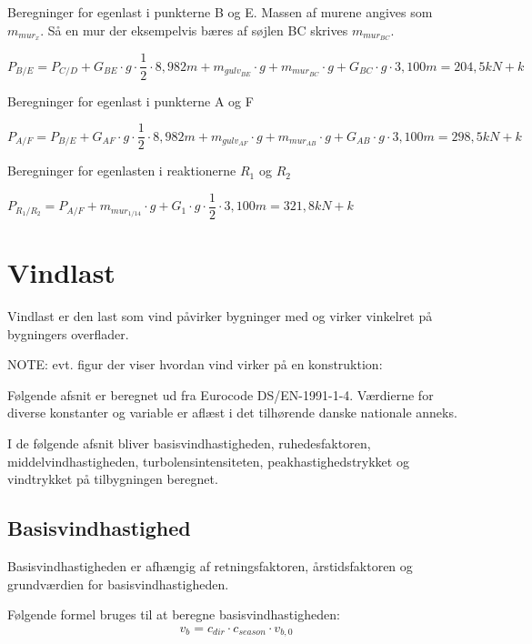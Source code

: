 Beregninger for egenlast i punkterne B og E. 
\newline
Massen af murene angives som $ m_{mur_{x}} $. Så en mur der eksempelvis bæres af søjlen BC skrives $ m_{mur_{BC}} $.
\begin{center}
	$ P_{B/E}=P_{C/D}+G_{BE}\cdot g\cdot \dfrac{1}{2}\cdot 8,982m+m_{gulv_{BE}}\cdot g+m_{mur_{BC}}\cdot g+G_{BC}\cdot g\cdot 3,100m=204,5kN+k$
\end{center}

Beregninger for egenlast i punkterne A og F
\begin{center}
	$ P_{A/F}=P_{B/E}+G_{AF}\cdot g\cdot \dfrac{1}{2}\cdot 8,982m+m_{gulv_{AF}}\cdot g+m_{mur_{AB}}\cdot g+G_{AB}\cdot g\cdot 3,100m =298,5kN+k$
\end{center}

Beregninger for egenlasten i reaktionerne $ R_{1} $ og $ R_{2} $
\begin{center}
	$ P_{R_{1}/R_{2}}=P_{A/F}+m_{mur_{1/14}}\cdot g+G_{1}\cdot g\cdot \dfrac{1}{2}\cdot 3,100m=321,8kN+k$
\end{center}






\section{Vindlast}
Vindlast er den last som vind påvirker bygninger med og virker vinkelret på bygningers overflader. 

NOTE: evt. figur der viser hvordan vind virker på en konstruktion:

Følgende afsnit er beregnet ud fra Eurocode DS/EN-1991-1-4. Værdierne for diverse konstanter og variable er aflæst i det tilhørende danske nationale anneks.

I de følgende afsnit bliver basisvindhastigheden, ruhedesfaktoren, middelvindhastigheden, turbolensintensiteten, peakhastighedstrykket og vindtrykket på tilbygningen beregnet.








\subsection{Basisvindhastighed}
Basisvindhastigheden er afhængig af retningsfaktoren, årstidsfaktoren og grundværdien for basisvindhastigheden.

Følgende formel bruges til at beregne basisvindhastigheden:
\begin{align*}
v_{b} = c_{dir} \cdot c_{season} \cdot v_{b,0}
\end{align*}

